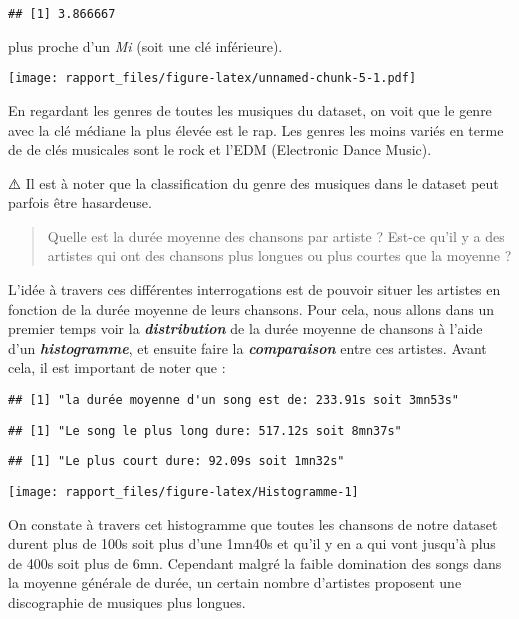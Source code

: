 \documentclass[
]{article}
\begin{document}
\begin{verbatim}
## [1] 3.866667
\end{verbatim}

plus proche d'un \emph{Mi} (soit une clé inférieure).

\texttt{[image: rapport\_files/figure-latex/unnamed-chunk-5-1.pdf]}

En regardant les genres de toutes les musiques du dataset, on voit que
le genre avec la clé médiane la plus élevée est le rap. Les genres les
moins variés en terme de de clés musicales sont le rock et l'EDM
(Electronic Dance Music).

⚠️ Il est à noter que la classification du genre des musiques dans le
dataset peut parfois être hasardeuse.

\begin{quote}
Quelle est la durée moyenne des chansons par artiste ? Est-ce qu'il y a
des artistes qui ont des chansons plus longues ou plus courtes que la
moyenne ?
\end{quote}

L'idée à travers ces différentes interrogations est de pouvoir situer
les artistes en fonction de la durée moyenne de leurs chansons. Pour
cela, nous allons dans un premier temps voir la
\textbf{\emph{distribution}} de la durée moyenne de chansons à l'aide
d'un \textbf{\emph{histogramme}}, et ensuite faire la
\textbf{\emph{comparaison}} entre ces artistes. Avant cela, il est
important de noter que :

\begin{verbatim}
## [1] "la durée moyenne d'un song est de: 233.91s soit 3mn53s"
\end{verbatim}

\begin{verbatim}
## [1] "Le song le plus long dure: 517.12s soit 8mn37s"
\end{verbatim}

\begin{verbatim}
## [1] "Le plus court dure: 92.09s soit 1mn32s"
\end{verbatim}

\begin{center}\texttt{[image: rapport\_files/figure-latex/Histogramme-1]} \end{center}

On constate à travers cet histogramme que toutes les chansons de notre
dataset durent plus de 100s soit plus d'une 1mn40s et qu'il y en a qui
vont jusqu'à plus de 400s soit plus de 6mn. Cependant malgré la faible
domination des songs dans la moyenne générale de durée, un certain
nombre d'artistes proposent une discographie de musiques plus longues.
\end{document}
